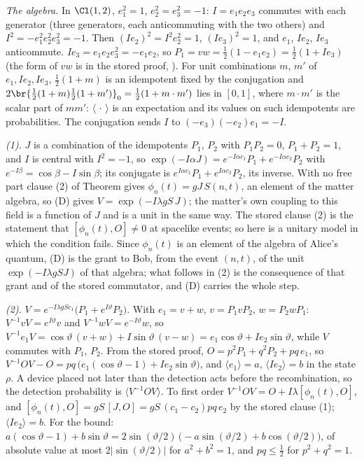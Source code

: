 \emph{The algebra.} In $\Cl(1,2)$, $e_{1}^{2} = 1$, $e_{2}^{2} = e_{3}^{2} = -1$: $I = e_{1}e_{2}e_{3}$ commutes with each generator (three generators, each anticommuting with the two others) and $I^{2} = -e_{1}^{2}e_{2}^{2}e_{3}^{2} = -1$. Then $(Ie_{2})^{2} = I^{2}e_{2}^{2} = 1$, $(Ie_{3})^{2} = 1$, and $e_{1}$, $Ie_{2}$, $Ie_{3}$ anticommute. $Ie_{3} = e_{1}e_{2}e_{3}^{2} = -e_{1}e_{2}$, so $P_{1} = vw = \tfrac12(1 - e_{1}e_{2}) = \tfrac12(1 + Ie_{3})$ (the form of $vw$ is in the stored proof, ). For unit combinations $m$, $m'$ of $e_{1}, Ie_{2}, Ie_{3}$, $\tfrac12(1 + m)$ is an idempotent fixed by the conjugation and $2\br{\tfrac12(1 + m)\tfrac12(1 + m')}_{0} = \tfrac12(1 + m \cdot m')$ lies in $[0,1]$, where $m \cdot m'$ is the scalar part of $mm'$: $\langle\,\cdot\,\rangle$ is an expectation and its values on such idempotents are probabilities. The conjugation sends $I$ to $(-e_{3})(-e_{2})e_{1} = -I$.

\emph{(1).} $J$ is a combination of the idempotents $P_{1}$, $P_{2}$ with $P_{1}P_{2} = 0$, $P_{1} + P_{2} = 1$, and $I$ is central with $I^{2} = -1$, so $\exp(-I\alpha J) = e^{-I\alpha c_{1}}P_{1} + e^{-I\alpha c_{2}}P_{2}$ with $e^{-I\beta} = \cos\beta - I\sin\beta$; its conjugate is $e^{I\alpha c_{1}}P_{1} + e^{I\alpha c_{2}}P_{2}$, its inverse. With no free part clause (2) of Theorem  gives $\phi_{n}(t) = gJ\,S(n,t)$, an element of the matter algebra, so (D) gives $V = \exp(-I\lambda gS\,J)$; the matter's own coupling to this field is a function of $J$ and is a unit in the same way. The stored clause (2) is the statement that $[\phi_{n}(t), O] \neq 0$ at spacelike events; so here is a unitary model in which the condition fails. Since $\phi_{n}(t)$ is an element of the algebra of Alice's quantum, (D) is the grant to Bob, from the event $(n,t)$, of the unit $\exp(-I\lambda gSJ)$ of that algebra; what follows in (2) is the consequence of that grant and of the stored commutator, and (D) carries the whole step.

\emph{(2).} $V = e^{-I\lambda gSc_{1}}\bigl(P_{1} + e^{I\vartheta}P_{2}\bigr)$. With $e_{1} = v + w$, $v = P_{1}vP_{2}$, $w = P_{2}wP_{1}$: $V^{-1}vV = e^{I\vartheta}v$ and $V^{-1}wV = e^{-I\vartheta}w$, so $V^{-1}e_{1}V = \cos\vartheta\,(v + w) + I\sin\vartheta\,(v - w) = e_{1}\cos\vartheta + Ie_{2}\sin\vartheta$, while $V$ commutes with $P_{1}$, $P_{2}$. From the stored proof, $O = p^{2}P_{1} + q^{2}P_{2} + pq\,e_{1}$, so $V^{-1}OV - O = pq\,\bigl(e_{1}(\cos\vartheta - 1) + Ie_{2}\sin\vartheta\bigr)$, and $\langle e_{1}\rangle = a$, $\langle Ie_{2}\rangle = b$ in the state $\rho$. A device placed not later than the detection acts before the recombination, so the detection probability is $\langle V^{-1}OV\rangle$. To first order $V^{-1}OV = O + I\lambda[\phi_{n}(t), O]$, and $[\phi_{n}(t), O] = gS\,[J, O] = gS\,(c_{1} - c_{2})pq\,e_{2}$ by the stored clause (1); $\langle Ie_{2}\rangle = b$. For the bound: $a(\cos\vartheta - 1) + b\sin\vartheta = 2\sin(\vartheta/2)\,\bigl(-a\sin(\vartheta/2) + b\cos(\vartheta/2)\bigr)$, of absolute value at most $2|\sin(\vartheta/2)|$ for $a^{2} + b^{2} = 1$, and $pq \le \tfrac12$ for $p^{2} + q^{2} = 1$.

